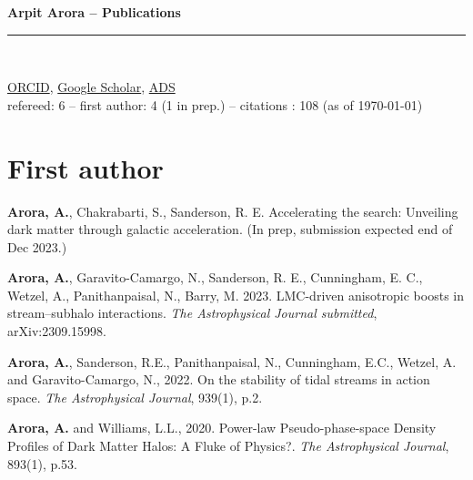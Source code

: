 \documentclass[UTF8]{article}
\begin{document}
\begin{center}
\indent \textbf{\LARGE Arpit Arora -- Publications} \\
\indent \rule{17cm}{0.4pt}\\
\end{center}

\noindent \href{https://orcid.org/0000-0002-8354-7356}{ORCID},
\href{https://scholar.google.com/citations?hl=en&view_op=list_works&gmla=AOV7GLNCPW8IsoVHZWL3Sumnh4dkvyrQEiY_I89IFD-VGtxXg0TP0jjxWp8nf4Htfz_1LwikT9G49boR3z5UuLgICZawXMdc3K20R_rtOo8&user=imlwFcsAAAAJ}{Google Scholar}, \href{https://ui.adsabs.harvard.edu/search/q=docs(library%2FFoo0PCcyQRuwOWcZNDtIlw)&sort=date%20desc%2C%20bibcode%20desc&p_=0}{ADS}\\
refereed: 6 -- first author: 4 (1 in prep.)  -- citations : 108 (as of \today)
\section*{First author}
\begin{etaremune}

\item  \textbf{Arora, A.}, Chakrabarti, S., Sanderson, R. E. Accelerating the search: Unveiling dark matter through galactic acceleration. (In prep, submission expected end of Dec 2023.)

\item \textbf{Arora, A.}, Garavito-Camargo, N., Sanderson, R. E., Cunningham, E. C., Wetzel, A., Panithanpaisal, N., Barry, M. 2023. LMC-driven anisotropic boosts in stream--subhalo interactions. \textit{The Astrophysical Journal submitted}, arXiv:2309.15998. 


\item \textbf{Arora, A.}, Sanderson, R.E., Panithanpaisal, N., Cunningham, E.C., Wetzel, A. and Garavito-Camargo, N., 2022. On the stability of tidal streams in action space. \textit{The Astrophysical Journal}, 939(1), p.2. 
  
\item \textbf{Arora, A.} and Williams, L.L., 2020. Power-law Pseudo-phase-space Density Profiles of Dark Matter Halos: A Fluke of Physics?. \textit{The Astrophysical Journal}, 893(1), p.53. 
\end{etaremune}
\end{document}
